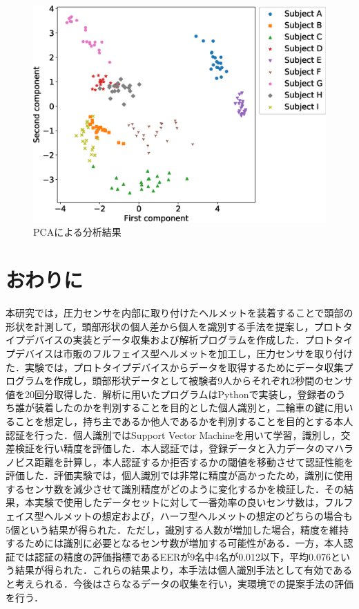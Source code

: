 \documentclass[Japanese,noauthor]{dicomopapers}
\begin{document}
\begin{figure}[!t]
  \centering
    \includegraphics[width=1\linewidth]{figure/PCA.eps}
  \caption{PCAによる分析結果}
  \label{PCA}
\end{figure}

\section{おわりに}
\label{conclude}
本研究では，圧力センサを内部に取り付けたヘルメットを装着することで頭部の形状を計測して，頭部形状の個人差から個人を識別する手法を提案し，プロトタイプデバイスの実装とデータ収集および解析プログラムを作成した．プロトタイプデバイスは市販のフルフェイス型ヘルメットを加工し，圧力センサを取り付けた．実験では，プロトタイプデバイスからデータを取得するためにデータ収集プログラムを作成し，頭部形状データとして被験者9人からそれぞれ2秒間のセンサ値を20回分取得した．解析に用いたプログラムはPythonで実装し，登録者のうち誰が装着したのかを判別することを目的とした個人識別と，二輪車の鍵に用いることを想定し，持ち主であるか他人であるかを判別することを目的とする本人認証を行った．個人識別ではSupport Vector Machineを用いて学習，識別し，交差検証を行い精度を評価した．本人認証では，登録データと入力データのマハラノビス距離を計算し，本人認証するか拒否するかの閾値を移動させて認証性能を評価した．評価実験では，個人識別では非常に精度が高かったため，識別に使用するセンサ数を減少させて識別精度がどのように変化するかを検証した．その結果，本実験で使用したデータセットに対して一番効率の良いセンサ数は，フルフェイス型ヘルメットの想定および，ハーフ型ヘルメットの想定のどちらの場合も5個という結果が得られた．ただし，識別する人数が増加した場合，精度を維持するためには識別に必要となるセンサ数が増加する可能性がある．一方，本人認証では認証の精度の評価指標であるEERが9名中4名が0.012以下，平均0.076という結果が得られた．これらの結果より，本手法は個人識別手法として有効であると考えられる．今後はさらなるデータの収集を行い，実環境での提案手法の評価を行う．



\end{document}
